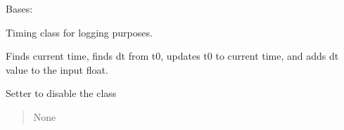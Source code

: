 \documentclass[letterpaper,10pt,english]{sphinxmanual}
\begin{document}
\begin{fulllineitems}
\label{\detokenize{api/killMS.Other:killMS.Other.ClassTimeIt.ClassTimeIt}}
\pysigstartsignatures
{}
\pysigstopsignatures
\sphinxAtStartPar
Bases: 

\sphinxAtStartPar
Timing class for logging purposes.
\begin{quote}\begin{description}
\end{description}\end{quote}

\begin{fulllineitems}
\label{\detokenize{api/killMS.Other:killMS.Other.ClassTimeIt.ClassTimeIt.AddDt}}
\pysigstartsignatures
{}
\pysigstopsignatures
\sphinxAtStartPar
Finds current time, finds dt from t0,
updates t0 to current time, and adds
dt value to the input float.
\begin{quote}\begin{description}
\sphinxAtStartPar
{}

\end{description}\end{quote}

\end{fulllineitems}


\begin{fulllineitems}
\label{\detokenize{api/killMS.Other:killMS.Other.ClassTimeIt.ClassTimeIt.disable}}
\pysigstartsignatures
{}
\pysigstopsignatures
\sphinxAtStartPar
Setter to disable the class
\begin{quote}\begin{description}
\sphinxAtStartPar
None


\end{description}
\end{quote}
\end{fulllineitems}
\end{fulllineitems}
\end{document}
